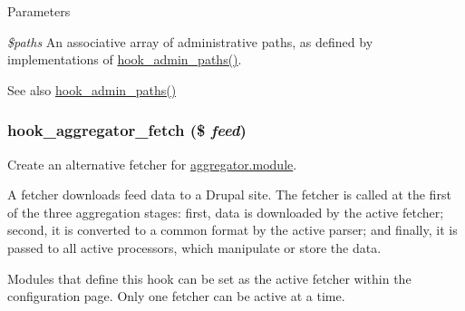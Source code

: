 \begin{DoxyParams}{Parameters}
\item[{\em \$paths}]An associative array of administrative paths, as defined by implementations of \hyperlink{group__hooks_ga3fe6d93afc8bb04afbd9e3c326d1bdc1}{hook\_\-admin\_\-paths()}.\end{DoxyParams}
\begin{DoxySeeAlso}{See also}
\hyperlink{group__hooks_ga3fe6d93afc8bb04afbd9e3c326d1bdc1}{hook\_\-admin\_\-paths()} 
\end{DoxySeeAlso}
\hypertarget{group__hooks_ga459db08cc062e9ea3bf1f526daf91a4a}{
\subsubsection[{hook\_\-aggregator\_\-fetch}]{\setlength{\rightskip}{0pt plus 5cm}hook\_\-aggregator\_\-fetch (\$ {\em feed})}}
\label{group__hooks_ga459db08cc062e9ea3bf1f526daf91a4a}
Create an alternative fetcher for \hyperlink{aggregator_8module}{aggregator.module}.

A fetcher downloads feed data to a Drupal site. The fetcher is called at the first of the three aggregation stages: first, data is downloaded by the active fetcher; second, it is converted to a common format by the active parser; and finally, it is passed to all active processors, which manipulate or store the data.

Modules that define this hook can be set as the active fetcher within the configuration page. Only one fetcher can be active at a time.


